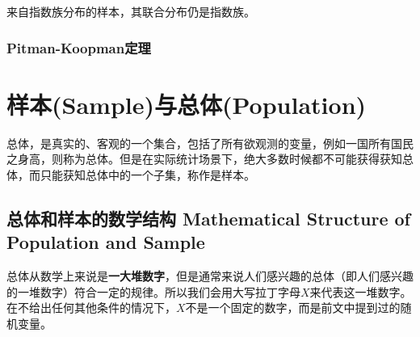 \documentclass[UTF8]{ctexbook}
\begin{document}
来自指数族分布的样本，其联合分布仍是指数族。
\subsection{Pitman-Koopman定理}
%
%
\chapter{样本(Sample)与总体(Population)}
总体，是真实的、客观的一个集合，包括了所有欲观测的变量，例如一国所有国民之身高，则称为总体。但是在实际统计场景下，绝大多数时候都不可能获得获知总体，而只能获知总体中的一个子集，称作是样本。

\section{总体和样本的数学结构 Mathematical Structure of Population and Sample}
总体从数学上来说是\textbf{一大堆数字}，但是通常来说人们感兴趣的总体（即人们感兴趣的一堆数字）符合一定的规律。所以我们会用大写拉丁字母$X$来代表这一堆数字。在不给出任何其他条件的情况下，$X$不是一个固定的数字，而是前文中提到过的随机变量。
\end{document}
